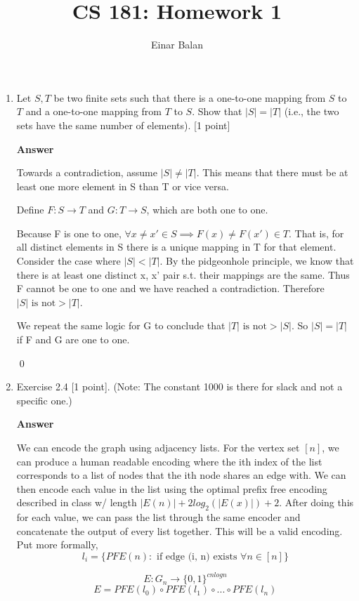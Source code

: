 \documentclass[11pt]{article}
\title{\bf{CS 181: Homework 1}}
\author{ Einar Balan}
\date{}
\newcommand \kw[1]{\textbf{#1}}
\newenvironment{answer}{
\vspace{.5cm}
\kw{Answer}
}
{

}
\begin{document}
\maketitle

\begin{enumerate}
\item Let $S, T$ be two finite sets such that there is a one-to-one mapping from $S$ to $T$ and a one-to-one mapping from $T$ to $S$. Show that $|S| = |T|$ (i.e., the two sets have the same number of elements). [1 point]

\begin{answer}
    Towards a contradiction, assume $|S| \ne |T|$. This means that there must be at least one more element in S than T or vice versa. 
    
    Define $F: S \rightarrow T$ and $G: T \rightarrow S$, which are both one to one. 

    Because F is one to one, $\forall x \neq x' \in S \implies F(x) \neq F(x') \in T$. That is, for all distinct elements in S there is a unique mapping in T for that element. Consider the case where $|S| < |T|$. By the pidgeonhole principle, we know that there is at least one distinct x, x' pair s.t. their mappings are the same. Thus F cannot be one to one and we have reached a contradiction. Therefore $|S| \text{ is not} > |T|$.

    We repeat the same logic for G to conclude that $|T| \text{ is not} > |S|$. So $|S| = |T|$ if F and G are one to one. 
    
    \qed
\end{answer}
\pagebreak

\item Exercise 2.4 [1 point]. (Note: The constant 1000 is there for slack and not  a specific one.)

\begin{answer}
We can encode the graph using adjacency lists. For the vertex set $[n]$, we can produce a human readable encoding where the ith index of the list corresponds to a list of nodes that the ith node shares an edge with. We can then encode each value in the list using the optimal prefix free encoding described in class w/ length $|E(n)| + 2log_2(|E(x)|) + 2$. After doing this for each value, we can pass the list through the same encoder and concatenate the output of every list together. This will be a valid encoding. Put more formally,
\[
    l_i = \{PFE(n) : \text{ if edge (i, n) exists } \forall n \in [n]\}
\]

\[
    E: G_n \rightarrow \{0,1\}^{cnlogn}
\]
\[
    E = PFE(l_0) \circ PFE(l_1) \circ ... \circ PFE(l_n)
\]


\end{answer}
\end{enumerate}
\end{document}
